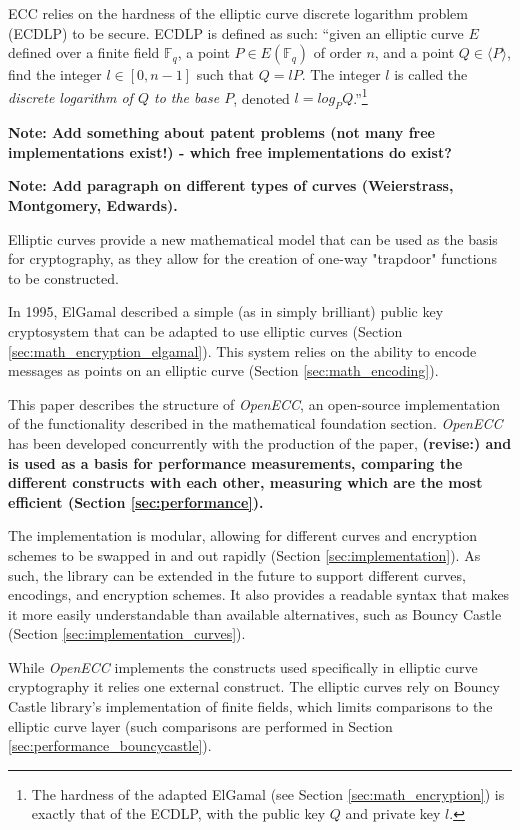 ECC relies on the hardness of the elliptic curve discrete logarithm problem (ECDLP) to be secure. ECDLP is
defined as such: ``given an elliptic curve \(E\) defined over a finite field \(\mathbb{F}_q\), a point
\(P \in E(\mathbb{F}_q)\) of order \(n\), and a point \(Q \in \langle P \rangle\), find the integer
\(l \in [0,n-1]\) such that \(Q = lP\). The integer \(l\) is called the \emph{discrete logarithm of
\(Q\) to the base \(P\)}, denoted \(l = log_P Q\).''\footnote{The hardness of the adapted ElGamal (see
Section \ref{sec:math_encryption}) is exactly that of the ECDLP, with the public key \(Q\) and private
key \(l\).}\cite{hankerson2010}

\textbf{Note: Add something about patent problems (not many free implementations exist!) - which free
implementations do exist?}

\textbf{Note: Add paragraph on different types of curves (Weierstrass, Montgomery, Edwards).}

Elliptic curves provide a new mathematical model that can be used as the basis for cryptography,
as they allow for the creation of one-way "trapdoor" functions to be constructed.

In 1995, ElGamal described a simple (as in simply brilliant) public key cryptosystem that can be adapted
to use elliptic curves (Section \ref{sec:math_encryption_elgamal}). This system relies on the ability to
encode messages as points on an elliptic curve (Section \ref{sec:math_encoding}).

This paper describes the structure of \emph{OpenECC}, an open-source implementation of the functionality
described in the mathematical foundation section. \emph{OpenECC} has been developed concurrently with the
production of the paper, \textbf{(revise:) and is used as a basis for performance measurements, comparing the different constructs
with each other, measuring which are the most efficient (Section \ref{sec:performance}).}

The implementation is modular, allowing for different curves and encryption schemes to be swapped in and out
rapidly (Section \ref{sec:implementation}). As such, the library can be extended in the future to support different
curves, encodings, and encryption schemes. It also provides a readable syntax that makes it more easily
understandable than available alternatives, such as Bouncy Castle (Section \ref{sec:implementation_curves}).

While \emph{OpenECC} implements the constructs used specifically in elliptic curve cryptography it relies one external construct.
The elliptic curves rely on Bouncy Castle library's implementation of finite fields, which limits comparisons to the elliptic curve
layer (such comparisons are performed in Section \ref{sec:performance_bouncycastle}).

